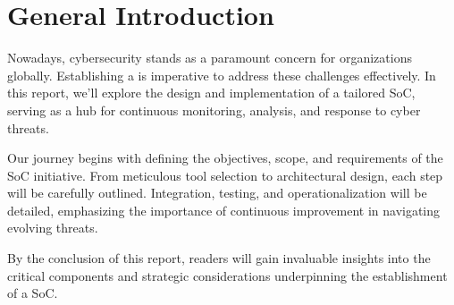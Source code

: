 \thispagestyle{plain} %
\section*{General Introduction}


Nowadays, cybersecurity stands as a paramount concern for organizations globally. Establishing a  is imperative to address these challenges effectively. In this report, we'll explore the design and implementation of a tailored SoC, serving as a hub for continuous monitoring, analysis, and response to cyber threats.

Our journey begins with defining the objectives, scope, and requirements of the SoC initiative. From meticulous tool selection to architectural design, each step will be carefully outlined. Integration, testing, and operationalization will be detailed, emphasizing the importance of continuous improvement in navigating evolving threats.

By the conclusion of this report, readers will gain invaluable insights into the critical components and strategic considerations underpinning the establishment of a SoC.

\newpage
